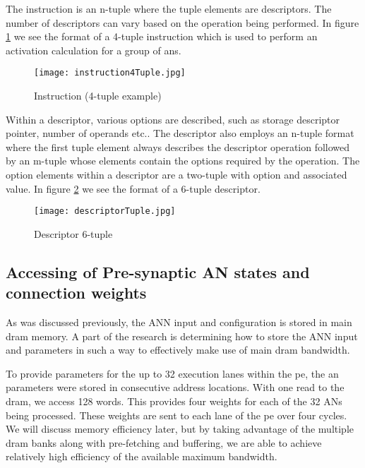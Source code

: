 The instruction is an n-tuple where the tuple elements are descriptors. The number of descriptors can vary based on the operation being performed. 
In figure \ref{fig:Instruction (4-tuple example)} we see the format of a 4-tuple instruction which is used to perform an activation calculation for a group of \acp{an}.

\begin{figure}[!t]
\centering
\captionsetup{justification=centering}
\captionsetup{width=.9\linewidth}
\centerline{
\mbox{\texttt{[image: instruction4Tuple.jpg]}}
}
\caption{Instruction (4-tuple example)}
\label{fig:Instruction (4-tuple example)}
\end{figure}

Within a descriptor, various options are described, such as storage descriptor pointer, number of operands etc..
The descriptor also employs an n-tuple format where the first tuple element always describes the descriptor operation followed by an m-tuple whose elements contain the options required by the operation.
The option elements within a descriptor are a two-tuple with option and associated value.
In figure \ref{fig:descriptorTuple} we see the format of a 6-tuple descriptor.

\begin{figure}[!t]
\centering
\captionsetup{justification=centering}
\captionsetup{width=.9\linewidth}
\centerline{
\mbox{\texttt{[image: descriptorTuple.jpg]}}
}
\caption{Descriptor 6-tuple}
\label{fig:descriptorTuple}
\end{figure}



\subsection{Accessing of Pre-synaptic AN states and connection weights}
\label{sec:AccessingANStates}

As was discussed previously, the ANN input and configuration is stored in main \ac{dram} memory. 
A part of the research is determining how to store the ANN input and parameters in such a way to effectively make use of main \ac{dram} bandwidth. 

To provide parameters for the up to 32 execution lanes within the \ac{pe}, the \ac{an} parameters were stored in consecutive address locations. 
With one read to the \ac{dram}, we access 128 words. This provides four weights for each of the 32 ANs being processed. 
These weights are sent to each lane of the \ac{pe} over four cycles. 
We will discuss memory efficiency later, but by taking advantage of the multiple \ac{dram} banks along with pre-fetching and buffering, we are able to achieve relatively high efficiency of the available maximum bandwidth.

